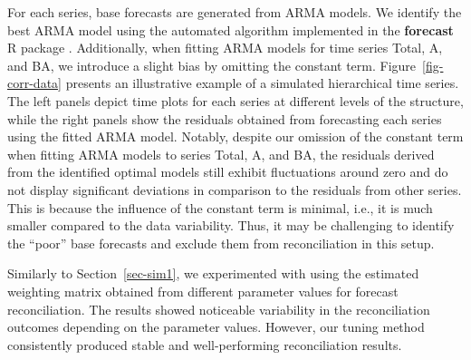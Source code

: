 \documentclass[
  11pt]{article}
\theoremstyle{plain}
\theoremstyle{remark}
\begin{document}
For each series, base forecasts are generated from ARMA models. We
identify the best ARMA model using the automated algorithm implemented
in the \textbf{forecast} R package \citep{HK08}. Additionally, when
fitting ARMA models for time series Total, A, and BA, we introduce a
slight bias by omitting the constant term. Figure~\ref{fig-corr-data}
presents an illustrative example of a simulated hierarchical time
series. The left panels depict time plots for each series at different
levels of the structure, while the right panels show the residuals
obtained from forecasting each series using the fitted ARMA model.
Notably, despite our omission of the constant term when fitting ARMA
models to series Total, A, and BA, the residuals derived from the
identified optimal models still exhibit fluctuations around zero and do
not display significant deviations in comparison to the residuals from
other series. This is because the influence of the constant term is
minimal, i.e., it is much smaller compared to the data variability.
Thus, it may be challenging to identify the ``poor'' base forecasts and
exclude them from reconciliation in this setup.

Similarly to Section~\ref{sec-sim1}, we experimented with using the
estimated weighting matrix obtained from different parameter values for
forecast reconciliation. The results showed noticeable variability in
the reconciliation outcomes depending on the parameter values. However,
our tuning method consistently produced stable and well-performing
reconciliation results.
\end{document}
